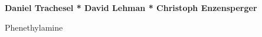 
{%
	\Large \raggedright \textbf{Daniel Trachesel * David Lehman * Christoph Enzensperger }
	
	Phenethylamine
}
